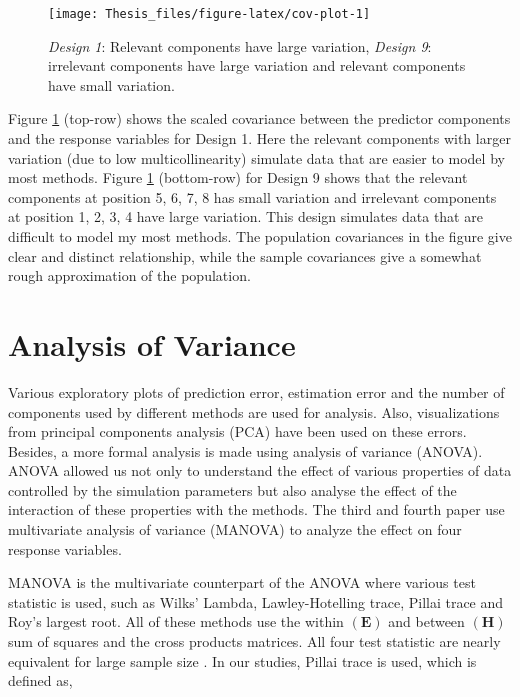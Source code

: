 \documentclass[11pt,twoside,openright,titlepage,
  headinclude,footinclude,BCOR=5mm,
  numbers=noenddot,cleardoublepage=empty,
  tablecaptionabove, dottedtoc,
  bibliography=totoc,paper=a4]{scrreprt}
\begin{document}
\begin{figure}[!htb]
\texttt{[image: Thesis\_files/figure-latex/cov-plot-1]} \caption{\emph{Design 1}: Relevant components have large variation, \emph{Design 9}: irrelevant components have large variation and relevant components have small variation.}\label{fig:cov-plot}
\end{figure}

Figure \ref{fig:cov-plot} (top-row) shows the scaled covariance between the predictor components and the response variables for Design 1. Here the relevant components with larger variation (due to low multicollinearity) simulate data that are easier to model by most methods. Figure \ref{fig:cov-plot} (bottom-row) for Design 9 shows that the relevant components at position 5, 6, 7, 8 has small variation and irrelevant components at position 1, 2, 3, 4 have large variation. This design simulates data that are difficult to model my most methods. The population covariances in the figure give clear and distinct relationship, while the sample covariances give a somewhat rough approximation of the population.

\hypertarget{analysis-of-variance}{%
\section{Analysis of Variance}\label{analysis-of-variance}}

Various exploratory plots of prediction error, estimation error and the number of components used by different methods are used for analysis. Also, visualizations from principal components analysis (PCA) have been used on these errors. Besides, a more formal analysis is made using analysis of variance (ANOVA). ANOVA allowed us not only to understand the effect of various properties of data controlled by the simulation parameters but also analyse the effect of the interaction of these properties with the methods. The third and fourth paper use multivariate analysis of variance (MANOVA) to analyze the effect on four response variables.

MANOVA is the multivariate counterpart of the ANOVA where various test statistic is used, such as Wilks' Lambda, Lawley-Hotelling trace, Pillai trace and Roy's largest root. All of these methods use the within \((\mathbf{E})\) and between \((\mathbf{H})\) sum of squares and the cross products matrices. All four test statistic are nearly equivalent for large sample size \citep{johnson2018applied}. In our studies, Pillai trace is used, which is defined as,
\end{document}
